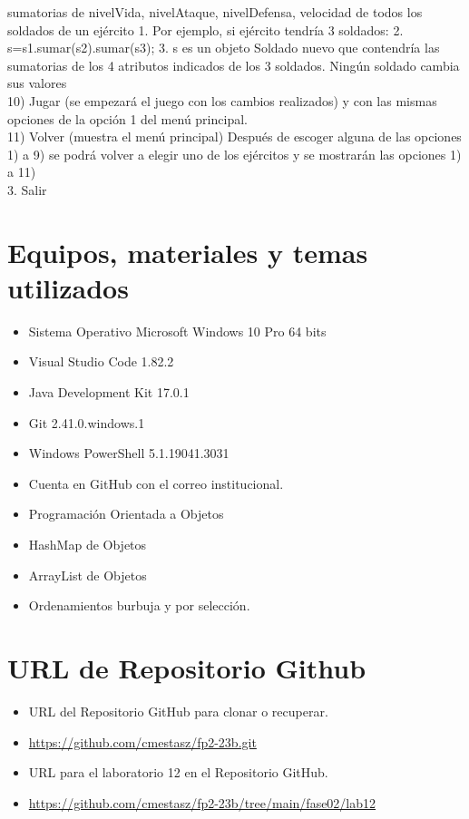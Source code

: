 \documentclass{article}
\begin{document}
\begin{itemize}
	      sumatorias de nivelVida, nivelAtaque, nivelDefensa, velocidad de
	      todos los soldados de un ejército
	      1. Por ejemplo, si ejército tendría 3 soldados:
	      2. s=s1.sumar(s2).sumar(s3);
	      3. s es un objeto Soldado nuevo que contendría las
	      sumatorias de los 4 atributos indicados de los 3 soldados.
	      Ningún soldado cambia sus valores\\
	      10) Jugar (se empezará el juego con los cambios realizados) y con
	      las mismas opciones de la opción 1 del menú principal.\\
	      11) Volver (muestra el menú principal)
	      Después de escoger alguna de las opciones 1) a 9) se podrá volver a
	      elegir uno de los ejércitos y se mostrarán las opciones 1) a 11)\\
	      3. Salir
\end{itemize}
\pagebreak

\section{Equipos, materiales y temas utilizados}
\begin{itemize}
	\item Sistema Operativo Microsoft Windows 10 Pro 64 bits
	\item Visual Studio Code 1.82.2
	\item Java Development Kit 17.0.1
	\item Git 2.41.0.windows.1
	\item Windows PowerShell 5.1.19041.3031
	\item Cuenta en GitHub con el correo institucional.
	\item Programación Orientada a Objetos
	\item HashMap de Objetos
	\item ArrayList de Objetos
	\item Ordenamientos burbuja y por selección.
\end{itemize}

\section{URL de Repositorio Github}
\begin{itemize}
	\item URL del Repositorio GitHub para clonar o recuperar.
	\item \url{https://github.com/cmestasz/fp2-23b.git}
	\item URL para el laboratorio 12 en el Repositorio GitHub.
	\item \url{https://github.com/cmestasz/fp2-23b/tree/main/fase02/lab12}
\end{itemize}
\pagebreak
\end{document}

